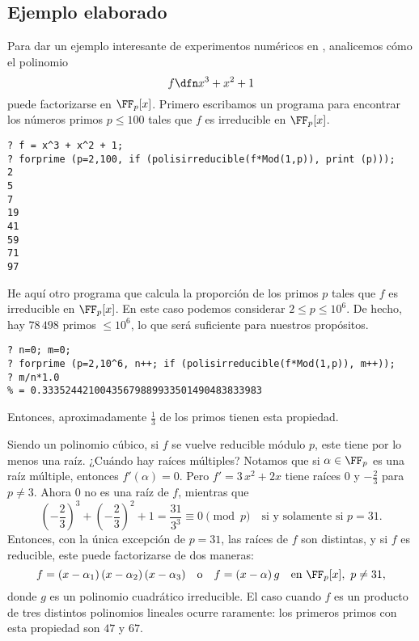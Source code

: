 \subsection*{Ejemplo elaborado}

Para dar un ejemplo interesante de experimentos numéricos en \gp{}, analicemos
cómo el polinomio
$$f \dfn x^3 + x^2 + 1$$
puede factorizarse en $\FF_p [x]$. Primero escribamos un programa para encontrar
los números primos $p \le 100$ tales que $f$ es irreducible en $\FF_p [x]$.

\begin{framed}\footnotesize
\begin{verbatim}
? f = x^3 + x^2 + 1;
? forprime (p=2,100, if (polisirreducible(f*Mod(1,p)), print (p)));
2
5
7
19
41
59
71
97
\end{verbatim}
\end{framed}

He aquí otro programa que calcula la proporción de los primos $p$ tales que $f$
es irreducible en $\FF_p [x]$. En este caso podemos considerar
$2 \le p \le 10^6$. De hecho, hay $78\,498$ primos $\le 10^6$, lo que será
suficiente para nuestros propósitos.

\begin{framed}\footnotesize
\begin{verbatim}
? n=0; m=0;
? forprime (p=2,10^6, n++; if (polisirreducible(f*Mod(1,p)), m++));
? m/n*1.0
% = 0.33352442100435679889933501490483833983
\end{verbatim}
\end{framed}

Entonces, aproximadamente $\frac{1}{3}$ de los primos tienen esta propiedad.

Siendo un polinomio cúbico, si $f$ se vuelve reducible módulo $p$, este tiene
por lo menos una raíz. ¿Cuándo hay raíces múltiples? Notamos que si
$\alpha \in \FF_p$ es una raíz múltiple, entonces $f' (\alpha) = 0$. Pero
$f' = 3\,x^2 + 2x$ tiene raíces $0$ y $-\frac{2}{3}$ para $p \ne 3$. Ahora $0$
no es una raíz de $f$, mientras que
\[ \left(-\frac{2}{3}\right)^3 + \left(-\frac{2}{3}\right)^2 + 1
  = \frac{31}{3^3} \equiv 0 \pmod{p}
  \quad\text{si y solamente si }p = 31. \]
Entonces, con la única excepción de $p = 31$, las raíces de $f$ son distintas, y
si $f$ es reducible, este puede factorizarse de dos maneras:
\[ f = (x-\alpha_1)\,(x-\alpha_2)\,(x-\alpha_3)
  \quad\text{o}\quad
  f = (x-\alpha)\,g
  \quad\text{en }\FF_p [x], ~ p\ne 31, \]
donde $g$ es un polinomio cuadrático irreducible. El caso cuando $f$ es un
producto de tres distintos polinomios lineales ocurre raramente: los primeros
primos con esta propiedad son $47$ y $67$.

